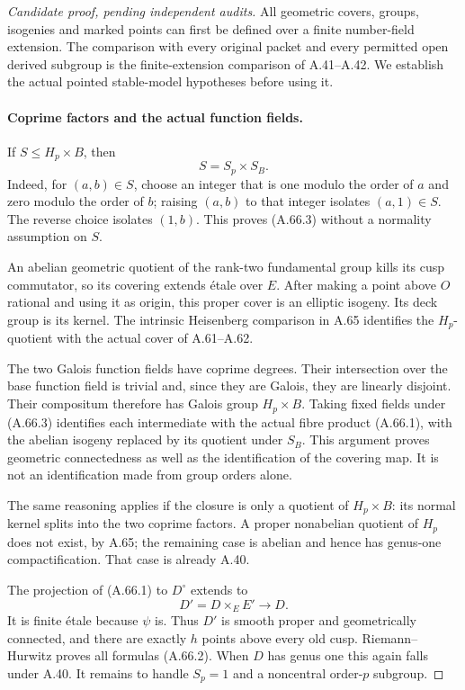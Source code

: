 \begin{proof}[Candidate proof, pending independent audits]
All geometric covers, groups, isogenies and marked points can
first be defined over a finite number-field extension. The
comparison with every original packet and every permitted open
derived subgroup is the finite-extension comparison of
A.41--A.42. We establish the actual pointed stable-model
hypotheses before using it.

\paragraph{Coprime factors and the actual function fields.}
If \(S\le H_p\times B\), then
\[
                         S=S_p\times S_B.
                                                               \tag{A.66.3}
\]
Indeed, for \((a,b)\in S\), choose an integer that is one
modulo the order of \(a\) and zero modulo the order of \(b\);
raising \((a,b)\) to that integer isolates \((a,1)\in S\).
The reverse choice isolates \((1,b)\). This proves (A.66.3)
without a normality assumption on \(S\).

An abelian geometric quotient of the rank-two fundamental
group kills its cusp commutator, so its covering extends
étale over \(E\). After making a point above \(O\) rational
and using it as origin, this proper cover is an elliptic
isogeny. Its deck group is its kernel. The intrinsic
Heisenberg comparison in A.65 identifies the \(H_p\)-quotient
with the actual cover of A.61--A.62.

The two Galois function fields have coprime degrees. Their
intersection over the base function field is trivial and,
since they are Galois, they are linearly disjoint. Their
compositum therefore has Galois group \(H_p\times B\).
Taking fixed fields under (A.66.3) identifies each intermediate
with the actual fibre product (A.66.1), with the abelian
isogeny replaced by its quotient under \(S_B\).
This argument proves geometric connectedness as well as the
identification of the covering map. It is not an identification
made from group orders alone.

The same reasoning applies if the closure is only a quotient
of \(H_p\times B\): its normal kernel splits into the two
coprime factors. A proper nonabelian quotient of \(H_p\) does
not exist, by A.65; the remaining case is abelian and hence
has genus-one compactification. That case is already A.40.

The projection of (A.66.1) to \(D^\circ\) extends to
\[
                         D'=D\times_E E'\longrightarrow D.
                                                               \tag{A.66.4}
\]
It is finite étale because \(\psi\) is. Thus \(D'\) is smooth
proper and geometrically connected, and there are exactly
\(h\) points above every old cusp. Riemann--Hurwitz proves
all formulas (A.66.2). When \(D\) has genus one this again
falls under A.40. It remains to handle \(S_p=1\) and a
noncentral order-\(p\) subgroup.


\end{proof}
